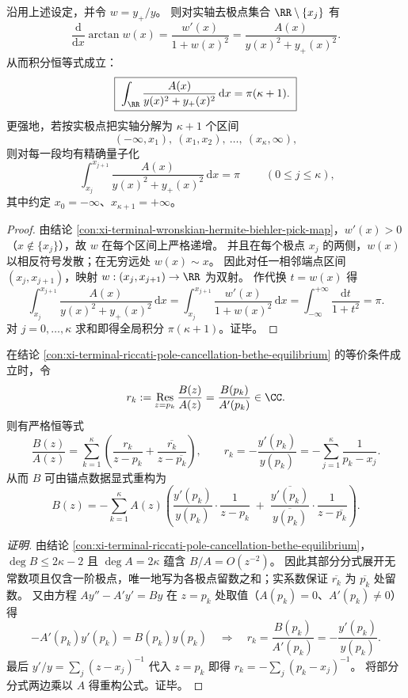 \begin{conclusion}[相位量子化：\texorpdfstring{$\int_{\RR}\frac{A}{y^2+y_{+}^2}=\pi(\kappa+1)$}{int A/(y^2+y+^2)=pi(k+1)} 与 \texorpdfstring{$\pi$}{pi}-步长分段]\label{con:xi-terminal-wronskian-phase-quantization}
沿用上述设定，并令 \(w=y_{+}/y\)。
则对实轴去极点集合 \(\RR\setminus\{x_j\}\) 有
\[
\frac{\mathrm{d}}{\mathrm{d}x}\arctan w(x)
=\frac{w'(x)}{1+w(x)^2}
=\frac{A(x)}{y(x)^2+y_{+}(x)^2}.
\]
从而积分恒等式成立：
\[
\boxed{\;\int_{\RR}\frac{A(x)}{y(x)^2+y_{+}(x)^2}\,\mathrm{d}x=\pi(\kappa+1).\;}
\]
更强地，若按实极点把实轴分解为 \(\kappa+1\) 个区间
\[
(-\infty,x_1),\ (x_1,x_2),\ \dots,\ (x_\kappa,\infty),
\]
则对每一段均有精确量子化
\[
\boxed{\;\int_{x_j}^{x_{j+1}}\frac{A(x)}{y(x)^2+y_{+}(x)^2}\,\mathrm{d}x=\pi\;}
\qquad(0\le j\le \kappa),
\]
其中约定 \(x_0=-\infty\)、\(x_{\kappa+1}=+\infty\)。
\end{conclusion}
\begin{proof}
由结论 \ref{con:xi-terminal-wronskian-hermite-biehler-pick-map}，\(w'(x)>0\)（\(x\notin\{x_j\}\)），故 \(w\) 在每个区间上严格递增。
并且在每个极点 \(x_j\) 的两侧，\(w(x)\) 以相反符号发散；在无穷远处 \(w(x)\sim x\)。
因此对任一相邻端点区间 \((x_j,x_{j+1})\)，映射 \(w:(x_j,x_{j+1})\to\RR\) 为双射。
作代换 \(t=w(x)\) 得
\[
\int_{x_j}^{x_{j+1}}\frac{A(x)}{y(x)^2+y_{+}(x)^2}\,\mathrm{d}x
=\int_{x_j}^{x_{j+1}}\frac{w'(x)}{1+w(x)^2}\,\mathrm{d}x
=\int_{-\infty}^{+\infty}\frac{\mathrm{d}t}{1+t^2}
=\pi.
\]
对 \(j=0,\dots,\kappa\) 求和即得全局积分 \(\pi(\kappa+1)\)。证毕。
\end{proof}

\begin{conclusion}\label{con:xi-terminal-van-vleck-ratio-residue-partial-fraction-reconstruction}
在结论 \ref{con:xi-terminal-riccati-pole-cancellation-bethe-equilibrium} 的等价条件成立时，令
\[
r_k:=\operatorname*{Res}_{z=p_k}\frac{B(z)}{A(z)}=\frac{B(p_k)}{A'(p_k)}\in\CC.
\]
则有严格恒等式
\[
\frac{B(z)}{A(z)}=\sum_{k=1}^{\kappa}\left(\frac{r_k}{z-p_k}+\frac{\overline{r_k}}{z-\overline{p_k}}\right),
\qquad
r_k=-\frac{y'(p_k)}{y(p_k)}=-\sum_{j=1}^{\kappa}\frac{1}{p_k-x_j}.
\]
从而 \(B\) 可由锚点数据显式重构为
\[
B(z)=
-\sum_{k=1}^{\kappa}A(z)\left(
\frac{y'(p_k)}{y(p_k)}\cdot\frac{1}{z-p_k}
\;+\;
\frac{\overline{y'(p_k)}}{\overline{y(p_k)}}\cdot\frac{1}{z-\overline{p_k}}
\right).
\]
\end{conclusion}
\begin{proof}[证明]
由结论 \ref{con:xi-terminal-riccati-pole-cancellation-bethe-equilibrium}，\(\deg B\le 2\kappa-2\) 且 \(\deg A=2\kappa\) 蕴含 \(B/A=O(z^{-2})\)。
因此其部分分式展开无常数项且仅含一阶极点，唯一地写为各极点留数之和；实系数保证 \(\overline{r_k}\) 为 \(\overline{p_k}\) 处留数。
又由方程 \(Ay''-A'y'=By\) 在 \(z=p_k\) 处取值（\(A(p_k)=0\)、\(A'(p_k)\neq 0\)）得
\[
-A'(p_k)y'(p_k)=B(p_k)y(p_k)\quad\Longrightarrow\quad r_k=\frac{B(p_k)}{A'(p_k)}=-\frac{y'(p_k)}{y(p_k)}.
\]
最后 \(y'/y=\sum_j(z-x_j)^{-1}\) 代入 \(z=p_k\) 即得 \(r_k=-\sum_j(p_k-x_j)^{-1}\)。
将部分分式两边乘以 \(A\) 得重构公式。证毕。
\end{proof}

